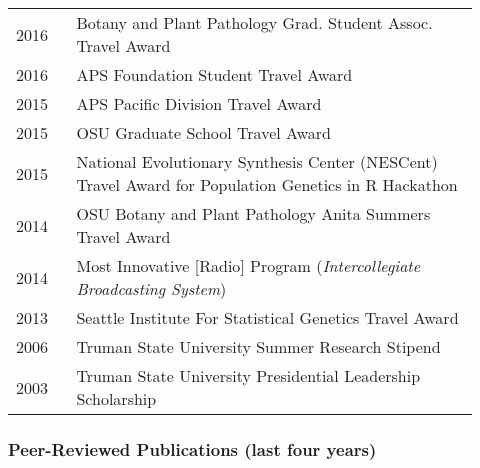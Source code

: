 \documentclass[12pt,letterpaper]{article}
\begin{document}
\begin{tabular}{p{0.125\linewidth}p{0.8\linewidth}}

2016 & Botany and Plant Pathology Grad. Student Assoc. Travel Award\\
2016 & APS Foundation Student Travel Award\\
2015 & APS Pacific Division Travel Award\\
2015 & OSU Graduate School Travel Award\\
2015 & National Evolutionary Synthesis Center (NESCent) Travel Award for Population Genetics in R Hackathon\\
2014 & OSU Botany and Plant Pathology Anita Summers Travel Award\\
2014 & Most Innovative [Radio] Program (\textit{Intercollegiate Broadcasting System})\\
2013 & Seattle Institute For Statistical Genetics Travel Award\\
2006 & Truman State University Summer Research Stipend\\
2003 & Truman State University Presidential Leadership Scholarship

\end{tabular}

\newpage

\subsubsection*{Peer-Reviewed Publications (last four years)}
\end{document}
